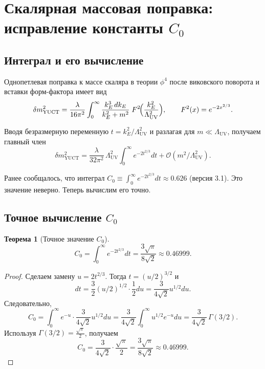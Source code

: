 \documentclass[11pt,a4paper]{article}
\newcommand{\LUV}{\Lambda_{\mathrm{UV}}}
\newtheorem{theorem}{Теорема}[section]
\theoremstyle{remark}
\begin{document}
	\section{Скалярная массовая поправка: исправление константы \(C_0\)}
	\label{sec:scalar}
	
	\subsection{Интеграл и его вычисление}
	
	Однопетлевая поправка к массе скаляра в теории \(\phi^4\) после виковского поворота и вставки форм-фактора имеет вид
	\begin{equation}
		\delta m^2_{\mathrm{YUCT}} = \frac{\lambda}{16\pi^2} \int_0^{\infty} \frac{k_E^3\, dk_E}{k_E^2 + m^2}\; F^2\!\Bigl(\frac{k_E^2}{\LUV^2}\Bigr), \qquad F^2(x) = e^{-2x^{2/3}}.
		\label{eq:scalar_YUCT}
	\end{equation}
	
	Вводя безразмерную переменную \(t = k_E^2/\LUV^2\) и разлагая для \(m \ll \LUV\), получаем главный член
	\begin{equation}
		\delta m^2_{\mathrm{YUCT}} = \frac{\lambda}{32\pi^2}\,\LUV^2 \int_0^{\infty} e^{-2t^{2/3}} dt + \mathcal{O}(m^2/\LUV^2).
		\label{eq:scalar_lead}
	\end{equation}
	
	Ранее сообщалось, что интеграл \(C_0 \equiv \int_0^{\infty} e^{-2t^{2/3}} dt \approx 0.626\) (версия 3.1). Это значение неверно. Теперь вычислим его точно.
	
	\subsection{Точное вычисление \(C_0\)}
	
	\begin{theorem}[Точное значение \(C_0\)]
		\label{thm:C0}
		\[
		C_0 = \int_0^{\infty} e^{-2t^{2/3}} dt = \frac{3\sqrt{\pi}}{8\sqrt{2}} \approx 0.46999.
		\]
	\end{theorem}
	
	\begin{proof}
		Сделаем замену \(u = 2t^{2/3}\). Тогда \(t = (u/2)^{3/2}\) и
		\[
		dt = \frac{3}{2} (u/2)^{1/2} \cdot \frac{1}{2} du = \frac{3}{4\sqrt{2}} u^{1/2} du.
		\]
		Следовательно,
		\[
		C_0 = \int_0^{\infty} e^{-u} \cdot \frac{3}{4\sqrt{2}} u^{1/2} du = \frac{3}{4\sqrt{2}} \int_0^{\infty} u^{1/2} e^{-u} du = \frac{3}{4\sqrt{2}} \, \Gamma(3/2).
		\]
		Используя \(\Gamma(3/2) = \frac{\sqrt{\pi}}{2}\), получаем
		\[
		C_0 = \frac{3}{4\sqrt{2}} \cdot \frac{\sqrt{\pi}}{2} = \frac{3\sqrt{\pi}}{8\sqrt{2}} \approx 0.46999.
		\]
	\end{proof}
	
\end{document}
